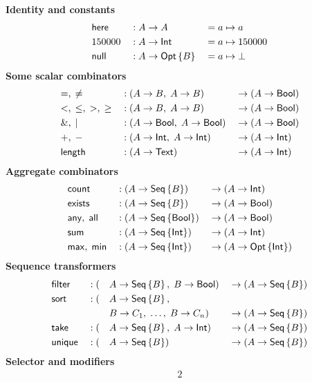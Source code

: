 
\begin{table}
    \begin{framed}
    \textbf{Identity and constants}
    \begin{alignat*}{3}
        & \Here && : A \to A && = a \mapsto a \\
        & 150000 && : A \to \Int && = a \mapsto 150000 \\
        & \Null && : A \to \Opt{B} && = a \mapsto \bot
    \end{alignat*}
    \textbf{Some scalar combinators}
    \begin{alignat*}{3}
        & {=},\;{\ne} && : (A \to B,\; A \to B) && \to (A \to \Bool) \\
        & {<},\;{\le},\;{>},\;{\ge} && : (A \to B,\; A \to B) && \to (A \to \Bool) \\
        & {\&},\;{|} && : (A \to \Bool,\; A \to \Bool) && \to (A \to \Bool) \\
        & {+},\;{-} && : (A \to \Int,\; A \to \Int) && \to (A \to \Int) \\
        & \Length && : (A \to \Text) && \to (A \to \Int)
    \end{alignat*}
    \textbf{Aggregate combinators}
    \begin{alignat*}{3}
        & \Count && : (A \to \Seq{B}) && \to (A \to \Int) \\
        & \Exists && : (A \to \Seq{B}) && \to (A \to \Bool) \\
        & \Any,\; \All && : (A \to \Seq{\Bool}) && \to (A \to \Bool) \\
        & \Sum && : (A \to \Seq{\Int}) && \to (A \to \Int) \\
        & \Max,\; \Min && : (A \to \Seq{\Int}) && \to (A \to \Opt{\Int})
    \end{alignat*}
    \textbf{Sequence transformers}
    \begin{alignat*}{4}
        & \Filter && : (&& A \to \Seq{B},\; B \to \Bool) && \to (A \to \Seq{B}) \\
        & \Sort && : (&& A \to \Seq{B},\; && \\
        & && && B \to C_1,\; \ldots,\; B \to C_n) && \to (A \to \Seq{B}) \\
        & \Take && : (&& A \to \Seq{B},\; A \to \Int) && \to (A \to \Seq{B}) \\
        & \Unique && : (&& A \to \Seq{B}) && \to (A \to \Seq{B})
    \end{alignat*}
    \textbf{Selector and modifiers}
    \begin{alignat*}{2}

\end{alignat*}
\end{framed}
\end{table}
